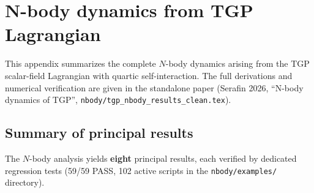 
\section{N-body dynamics from TGP Lagrangian}%
\label{app:nbody}

This appendix summarizes the complete $N$-body dynamics arising from the
TGP scalar-field Lagrangian with quartic self-interaction.
The full derivations and numerical verification are given in the
standalone paper (Serafin 2026, ``N-body dynamics of TGP'',
\texttt{nbody/tgp\_nbody\_results\_clean.tex}).



\subsection{Summary of principal results}%
\label{subsec:nbody-results-summary}

The $N$-body analysis yields \textbf{eight} principal results,
each verified by dedicated regression tests (59/59 PASS,
102 active scripts in the \texttt{nbody/examples/} directory).

